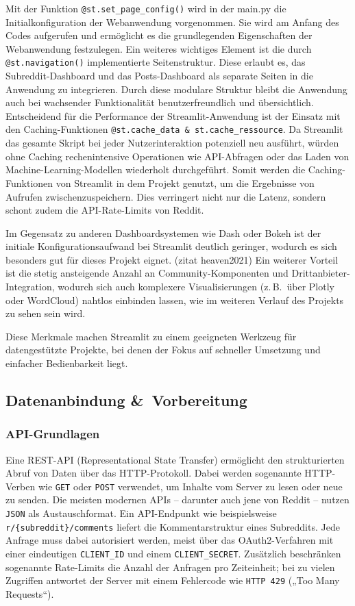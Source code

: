 Mit der Funktion \verb|@st.set_page_config()| wird in der main.py die Initialkonfiguration der Webanwendung vorgenommen. Sie wird am Anfang des Codes aufgerufen und ermöglicht es die grundlegenden Eigenschaften der Webanwendung festzulegen.
Ein weiteres wichtiges Element ist die durch \verb|@st.navigation()| implementierte Seitenstruktur. Diese erlaubt es, das Subreddit-Dashboard und das Posts-Dashboard als separate Seiten in die Anwendung zu integrieren. Durch diese modulare Struktur bleibt die Anwendung auch bei wachsender Funktionalität benutzerfreundlich und übersichtlich.
Entscheidend für die Performance der Streamlit-Anwendung ist der Einsatz mit den Caching-Funktionen \verb|@st.cache_data & st.cache_ressource|. Da Streamlit das gesamte Skript bei jeder Nutzerinteraktion potenziell neu ausführt, würden ohne Caching rechenintensive Operationen wie API-Abfragen oder das Laden von Machine-Learning-Modellen wiederholt durchgeführt. Somit werden die Caching-Funktionen von Streamlit in dem Projekt genutzt, um die Ergebnisse von Aufrufen zwischenzuspeichern. Dies verringert nicht nur die Latenz, sondern schont zudem die API-Rate-Limits von Reddit.

Im Gegensatz zu anderen Dashboardsystemen wie Dash oder Bokeh ist der initiale Konfigurationsaufwand bei Streamlit deutlich geringer, wodurch es sich besonders gut für dieses Projekt eignet. (zitat heaven2021) 
Ein weiterer Vorteil ist die stetig ansteigende Anzahl an Community-Komponenten und Drittanbieter-Integration, wodurch sich auch komplexere Visualisierungen (z.\,B.\ über Plotly oder WordCloud) nahtlos einbinden lassen, wie im weiteren Verlauf des Projekts zu sehen sein wird. 

Diese Merkmale machen Streamlit zu einem geeigneten Werkzeug für datengestützte Projekte, bei denen der Fokus auf schneller Umsetzung und einfacher Bedienbarkeit liegt.


\subsection{Datenanbindung \&~Vorbereitung}

\subsubsection{API-Grundlagen}
Eine REST-API (Representational State Transfer) ermöglicht
den strukturierten Abruf von Daten über das HTTP-Protokoll.
Dabei werden sogenannte HTTP-Verben wie \texttt{GET} oder \texttt{POST} verwendet, um Inhalte vom Server zu lesen oder neue zu senden.
Die meisten modernen APIs – darunter auch jene von Reddit – nutzen \texttt{JSON} als Austauschformat.
Ein API-Endpunkt wie beispielsweise \texttt{r/\{subreddit\}/comments} liefert die Kommentarstruktur eines Subreddits.
Jede Anfrage muss dabei autorisiert werden, meist über das OAuth2-Verfahren mit einer eindeutigen \texttt{CLIENT\_ID} und einem \texttt{CLIENT\_SECRET}.
Zusätzlich beschränken sogenannte Rate-Limits die Anzahl der Anfragen pro Zeiteinheit; bei zu vielen Zugriffen antwortet der Server mit einem Fehlercode wie \texttt{HTTP 429} („Too Many Requests“).

